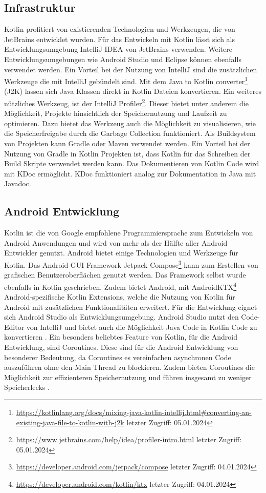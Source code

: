 \documentclass{article}
\begin{document}
\subsection{Infrastruktur}
Kotlin profitiert von existierenden Technologien und Werkzeugen, die von JetBrains entwicklet wurden. Für das Entwickeln mit Kotlin lässt sich als Entwicklungsumgebung IntelliJ IDEA von JetBrains verwenden. Weitere Entwicklungsumgebungen wie Android Studio und Eclipse können ebenfalls verwendet werden. Ein Vorteil bei der Nutzung von IntelliJ sind die zusätzlichen Werkzeuge die mit IntelliJ gebündelt sind. Mit dem Java to Kotlin converter\footnote{\url{https://kotlinlang.org/docs/mixing-java-kotlin-intellij.html#converting-an-existing-java-file-to-kotlin-with-j2k} letzter Zugriff: 05.01.2024} (J2K) lassen sich Java Klassen direkt in Kotlin Dateien konvertieren. Ein weiteres nützliches Werkzeug, ist der IntelliJ Profiler\footnote{\url{https://www.jetbrains.com/help/idea/profiler-intro.html} letzter Zugriff: 05.01.2024}. Dieser bietet unter anderem die Möglichkeit, Projekte hinsichtlich der Speichernutzung und Laufzeit zu optimieren. Dazu bietet das Werkzeug auch die Möglichkeit zu visualisieren, wie die Speicherfreigabe durch die Garbage Collection funktioniert. \newline
Als Buildsystem von Projekten kann Gradle oder Maven verwendet werden. Ein Vorteil bei der Nutzung von Gradle in Kotlin Projekten ist, dass Kotlin für das Schreiben der Build Skripte verwendet werden kann. Das Dokumentieren von Kotlin Code wird mit KDoc ermöglicht. KDoc funktioniert analog zur Dokumentation in Java mit Javadoc.

\subsection{Android Entwicklung}
Kotlin ist die von Google empfohlene Programmiersprache zum Entwickeln von Android Anwendungen und wird von mehr als der Hälfte aller Android Entwickler genutzt. Android bietet einige Technologien und Werkzeuge für Kotlin. Das Android GUI Framework Jetpack Compose\footnote{\url{https://developer.android.com/jetpack/compose} letzter Zugriff: 04.01.2024} kann zum Erstellen von grafischen Benutzeroberflächen genutzt werden. Das Framework selbst wurde ebenfalls in Kotlin geschrieben. Zudem bietet Android, mit AndroidKTX\footnote{\url{https://developer.android.com/kotlin/ktx} letzter Zugriff: 04.01.2024} Android-spezifische Kotlin Extensions, welche die Nutzung von Kotlin für Android mit zusätzlichen Funktionalitäten erweitert. Für die Entwicklung eignet sich Android Studio als Entwicklungsumgebung. Android Studio nutzt den Code-Editor von IntelliJ und bietet auch die Möglichkeit Java Code in Kotlin Code zu konvertieren \cite{AndroidKotlin}. \newline
Ein besonders beliebtes Feature von Kotlin, für die Android Entwicklung, sind Coroutines. Diese sind für die Android Entwicklung von besonderer Bedeutung, da Coroutines es vereinfachen asynchronen Code auszuführen ohne den Main Thread zu blockieren. Zudem bieten Coroutines die Möglichkeit zur effizienteren Speichernutzung und führen insgesamt zu weniger Speicherlecks \cite{AndroidCoroutine}.
\end{document}
